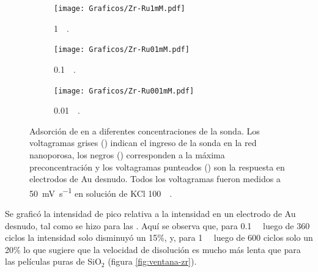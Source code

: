 		 		\begin{figure}[h!]
			   	    \begin{subfigure}[t]{0.325\textwidth}
			        	\texttt{[image: Graficos/Zr-Ru1mM.pdf]}
			        	\caption{\aminorutenio\space \SI{1}{\milli\Molar}.}
			         	\label{fig:Zr-Ru1mM}
			     		\end{subfigure}
			   	    \begin{subfigure}[t]{0.325\textwidth}
			        	\texttt{[image: Graficos/Zr-Ru01mM.pdf]}
			       		\caption{\aminorutenio\space \SI{0.1}{\milli\Molar}.}
			         	\label{fig:Zr-Ru0.1mM}
			     		\end{subfigure}
		     		\begin{subfigure}[t]{0.325\textwidth}
			        	\texttt{[image: Graficos/Zr-Ru001mM.pdf]}
			       		\caption{\aminorutenio\space \SI{0.01}{\milli\Molar}.}
			         	\label{fig:Zr-Ru0.01mM}
			     		\end{subfigure}
			     		\caption[Preconcentración de \aminorutenio\space en \pdmZ]{Adsorción de \ru\space en \pdmZ\space a diferentes concentraciones de la sonda. Los voltagramas grises (\usebox{\gris}) indican el ingreso de la sonda en la red nanoporosa, los negros (\usebox{\negro}) corresponden a la máxima preconcentración y los voltagramas punteados (\usebox{\punteado}) son la respuesta en electrodos de Au desnudo. Todos los voltagramas fueron medidos a \SI{50}{\milli\volt\per\second} en solución de KCl \SI{100}{\milli\Molar}.}
			     		\label{fig:precon_ZR}
		     		\end{figure}

		 \vspace*{2mm} Se graficó la intensidad de pico relativa a la intensidad en un electrodo de Au desnudo, tal como se hizo para las \pdmF. Aquí se observa que, para \ru\space \SI{0.1}{\milli\Molar} luego de 360 ciclos la intensidad solo disminuyó un 15\%, y, para \ru\space \SI{1}{\milli\Molar} luego de 600 ciclos solo un 20\%  lo que sugiere que la velocidad de disolución es mucho más lenta que para las películas puras de SiO$_2$ (figura \ref{fig:ventana-zr}).
			     	
